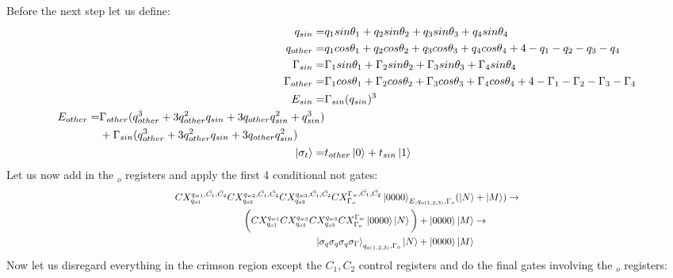 Before the next step let us define:
\begin{align}
    q_{sin} =& q_1sin\theta_1+q_2sin\theta_2+q_3sin\theta_3+q_4sin\theta_4\\
    q_{other} =& q_1cos\theta_1+q_2cos\theta_2+q_3cos\theta_3+q_4cos\theta_4+4-q_1-q_2-q_3-q_4\\
    \Gamma_{sin} =& \Gamma_1sin\theta_1+\Gamma_2sin\theta_2+\Gamma_3sin\theta_3+\Gamma_4sin\theta_4\\
    \Gamma_{other} =& \Gamma_1cos\theta_1+\Gamma_2cos\theta_2+\Gamma_3cos\theta_3+\Gamma_4cos\theta_4+4-\Gamma_1-\Gamma_2-\Gamma_3-\Gamma_4\\
    E_{sin} =& \Gamma_{sin}(q_{sin})^3\\
    \begin{split}
        E_{other} = &\Gamma_{other}(q_{other}^3+3q_{other}^2q_{sin}+3q_{other}q_{sin}^2+q_{sin}^3)\\
        &+\Gamma_{sin}(q_{other}^3+3q_{other}^2q_{sin}+3q_{other}q_{sin}^2)
    \end{split}\\
    \ket{\sigma_t} = &t_{other}\ket{0}+t_{sin}\ket{1}\\
\end{align}
Let us now add in the $ _o$ registers and apply the first 4 conditional not gates:
\begin{equation}
   \resizebox{.9\hsize}{!}{$\begin{split}
        CX_{q_{o1}}^{q_{w1},\bar{C_1},\bar{C_2}}CX_{q_{o2}}^{q_{w2},\bar{C_1},\bar{C_2}}CX_{q_{o3}}^{q_{w3},\bar{C_1},\bar{C_2}}CX_{\Gamma_o}^{\Gamma_w,\bar{C_1},\bar{C_2}}
        \ket{0000}_{E,q_{o(1,2,3)},\Gamma_o}&(\ket{N}+\ket{M})\to\\
        \bigg(CX_{q_{o1}}^{q_{w1}}CX_{q_{o2}}^{q_{w2}}CX_{q_{o3}}^{q_{w3}}CX_{\Gamma_o}^{\Gamma_w}
        \ket{0000}\ket{N}\bigg)+\ket{0000}&\ket{M}\to\\
        \ket{\sigma_q\sigma_q\sigma_q\sigma_\Gamma}_{q_{o(1,2,3)},\Gamma_{o}}\ket{N}+\ket{0000}&\ket{M}\\
   \end{split}$}
\end{equation}
Now let us disregard everything in the crimson region except the $C_1,C_2$ control registers and do the final gates involving the $ _o$ registers:
